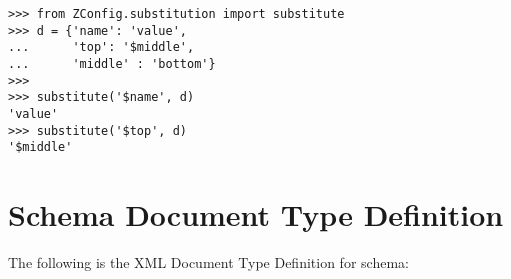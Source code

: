 \documentclass{howto}
\begin{document}
\begin{verbatim}
>>> from ZConfig.substitution import substitute
>>> d = {'name': 'value',
...      'top': '$middle',
...      'middle' : 'bottom'}
>>>
>>> substitute('$name', d)
'value'
>>> substitute('$top', d)
'$middle'
\end{verbatim}


\appendix
\section{Schema Document Type Definition \label{schema-dtd}}

The following is the XML Document Type Definition for 
schema:


\end{document}

